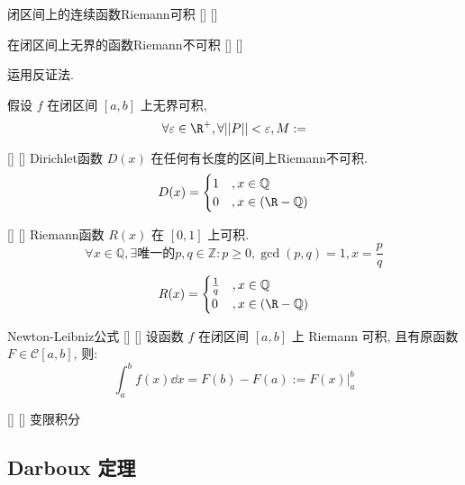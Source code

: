 \documentclass[UTF8]{ctexart}
\begin{document}
			\begin{ppt}
			    []
			    {闭区间上的连续函数Riemann可积}
			    []
			    []
			\end{ppt}
			
			\begin{ppt}
			    []
			    {在闭区间上无界的函数Riemann不可积}
			    []
			    []
			\end{ppt}
   
			\begin{prf}
				
				运用反证法. 
				
				假设 \(f\) 在闭区间 \([a,b]\) 上无界可积, 
				\[\forall\varepsilon\in\R^+, \forall ||P||<\varepsilon, M:=\]
                \end{prf}
			
			\begin{xmp}
			    []
			    {}
			    []
			    []
				Dirichlet函数 \(D(x)\) 在任何有长度的区间上Riemann不可积. 
				\[D(x)=
				\begin{cases}
					1 & ,x\in\mathbb{Q}\\
					0 & ,x\in(\R-\mathbb{Q})\\
				\end{cases}\]
			\end{xmp}
			
			\begin{xmp}
			    []
			    {}
			    []
			    []
				Riemann函数 \(R(x)\) 在 \([0,1]\) 上可积. 
				\[\forall x\in\mathbb{Q}, \exists\mbox{唯一的}p,q\in\mathbb{Z}: p\geq 0, \gcd(p,q)=1, x=\frac{p}{q}\]
				\[R(x)=\begin{cases}\frac{1}{q} & ,x\in\mathbb{Q}\\0 & ,x\in(\R-\mathbb{Q})\end{cases}\]
			\end{xmp}
            
            \begin{thm}
			    []
			    {Newton-Leibniz公式}
			    []
			    []
                设函数 \(f\) 在闭区间 \([a,b]\) 上 Riemann 可积, 且有原函数 \(F\in\mathcal{C}[a,b]\), 则: 
                \[\int_a^b f(x)\dd x=F(b)-F(a):=F(x)\Big|_a^b\]
            \end{thm}

            \begin{dfn}
			    []
			    {}
			    []
			    []
                变限积分
            \end{dfn}
		
		\subsection{Darboux 定理}
			
\end{document}
